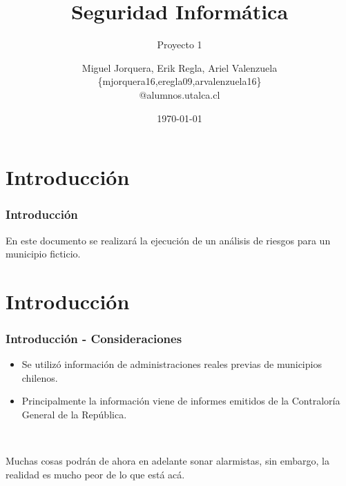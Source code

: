 \documentclass{beamer}
\title[Seguridad Informática]{Seguridad Informática}
\subtitle{Proyecto 1}    %
\author[M. Jorquera, E. Regla, A. Valenzuela]{
	Miguel Jorquera, Erik Regla, Ariel Valenzuela\\
	\{mjorquera16,eregla09,arvalenzuela16\}\\@alumnos.utalca.cl}                 %
\institute[UTalca]{Universidad de Talca}      %
\date{\today}      %
\begin{document}
\begin{frame}
  \titlepage
\end{frame}



\section{Introducción}
\begin{frame}[c,fragile]
	\frametitle{Introducción}

	En este documento se realizará la ejecución de un análisis de riesgos para un municipio ficticio.
	
\end{frame}


\section{Introducción}
\begin{frame}[c,fragile]
	\frametitle{Introducción - Consideraciones}

	\begin{itemize}
		\item Se utilizó información de administraciones reales previas de municipios chilenos.
		\item Principalmente la información viene de informes emitidos de la Contraloría General de la República.
	\end{itemize}

	\\ \pause

	Muchas cosas podrán de ahora en adelante sonar alarmistas, sin embargo, la realidad es mucho peor de lo que está acá.
\end{frame}
\end{document}
